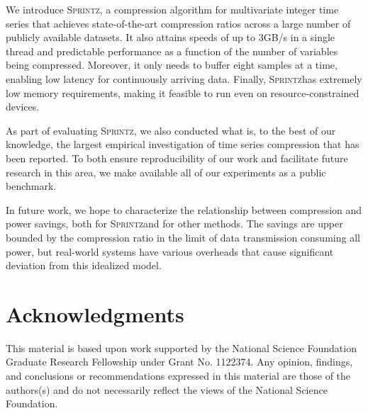\documentclass[acmlarge]{acmart}
\newcommand{\mine}{\textsc{Sprintz}}
\newcommand{\minesp}{\textsc{Sprintz}\text{ }}
\begin{document}
We introduce \mine, a compression algorithm for multivariate integer time series that achieves state-of-the-art compression ratios across a large number of publicly available datasets. It also attains speeds of up to 3GB/s in a single thread and predictable performance as a function of the number of variables being compressed. Moreover, it only needs to buffer eight samples at a time, enabling low latency for continuously arriving data. Finally, \minesp has extremely low memory requirements, making it feasible to run even on resource-constrained devices.

As part of evaluating \mine, we also conducted what is, to the best of our knowledge, the largest empirical investigation of time series compression that has been reported. To both ensure reproducibility of our work and facilitate future research in this area, we make available all of our experiments as a public benchmark.

In future work, we hope to characterize the relationship between compression and power savings, both for \minesp and for other methods. The savings are upper bounded by the compression ratio in the limit of data transmission consuming all power, but real-world systems have various overheads that cause significant deviation from this idealized model.


\section*{Acknowledgments}

This material is based upon work supported by the National Science Foundation Graduate Research Fellowship under Grant No. 1122374. Any opinion, findings, and conclusions or recommendations expressed in this material are those of the authors(s) and do not necessarily reflect the views of the National Science Foundation.

% 



\balance
\end{document}
